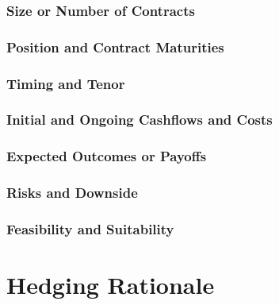 \documentclass[11pt, a4paper, british]{article}
\begin{document}
\subsubsection{Size or Number of Contracts}

\subsubsection{Position and Contract Maturities}

\subsubsection{Timing and Tenor}

\subsubsection{Initial and Ongoing Cashflows and Costs}

\subsubsection{Expected Outcomes or Payoffs}

\subsubsection{Risks and Downside}

\subsubsection{Feasibility and Suitability}

\newpage

\section{Hedging Rationale}
\end{document}
